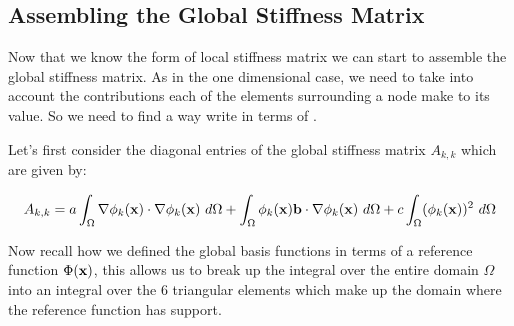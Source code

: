 \subsection{Assembling the Global Stiffness Matrix}

Now that we know the form of local stiffness matrix
 we can start to assemble the global stiffness
matrix. As in the one dimensional case, we need to take into account the
contributions each of the elements surrounding a node make to its value. So we
need to find a way write  in terms of
.

Let's first consider the diagonal entries of the global stiffness matrix
$A_{k,k}$ which are given by:

\begin{align*}
A_{k,k} =
    a\int_{\Omega}\nabla\phi_k(\mathbf{x}) \cdot \nabla\phi_k(\mathbf{x})\ d\Omega
    + \int_{\Omega}\phi_k(\mathbf{x})\mathbf{b} \cdot \nabla\phi_k(\mathbf{x})\ d\Omega
    + c\int_{\Omega}(\phi_k(\mathbf{x}))^2\ d\Omega
\end{align*}

Now recall how we defined the global basis functions in terms of a reference
function $\Phi(\mathbf{x})$, this allows us to break up the integral over the entire
domain $\Omega$ into an integral over the 6 triangular elements which make up
the domain where the reference function has support.
